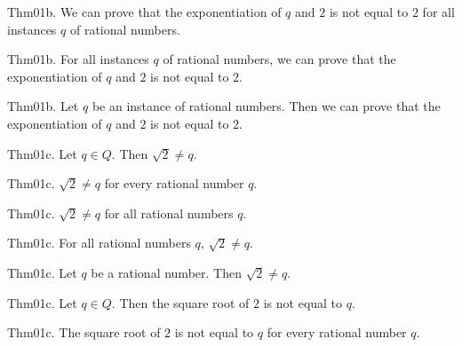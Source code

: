 \documentclass{article}
\begin{document}
Thm01b. We can prove that the exponentiation of $q$ and $2$ is not equal to $2$ for all instances $q$ of rational numbers.

Thm01b. For all instances $q$ of rational numbers, we can prove that the exponentiation of $q$ and $2$ is not equal to $2$.

Thm01b. Let $q$ be an instance of rational numbers. Then we can prove that the exponentiation of $q$ and $2$ is not equal to $2$.

Thm01c. Let $q \in Q$. Then $\sqrt{ 2}\neq q$.

Thm01c. $\sqrt{ 2}\neq q$ for every rational number $q$.

Thm01c. $\sqrt{ 2}\neq q$ for all rational numbers $q$.

Thm01c. For all rational numbers $q$, $\sqrt{ 2}\neq q$.

Thm01c. Let $q$ be a rational number. Then $\sqrt{ 2}\neq q$.

Thm01c. Let $q \in Q$. Then the square root of $2$ is not equal to $q$.

Thm01c. The square root of $2$ is not equal to $q$ for every rational number $q$.
\end{document}
